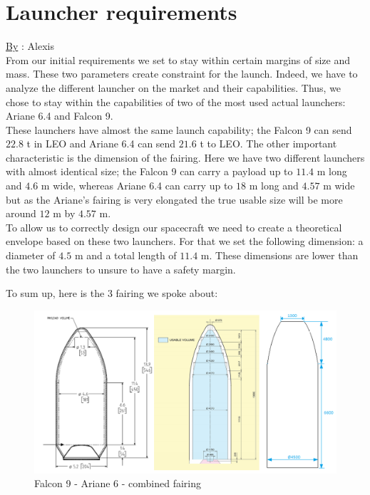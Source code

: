 \section{Launcher requirements}
\qquad \underline{By} : Alexis\\

From our initial requirements we set to stay within certain margins of size and mass. These two parameters create constraint for the launch. 
Indeed, we have to analyze the different launcher on the market and their capabilities. 
Thus, we chose to stay within the capabilities of two of the most used actual launchers: Ariane 6.4 and Falcon 9. \\

These launchers have almost the same launch capability; the Falcon 9 can send $22.8$ t in LEO and Ariane 6.4 can send $21.6$ t to LEO.
The other important characteristic is the dimension of the fairing.
Here we have two different launchers with almost identical size; the Falcon 9 can carry a payload up to $11.4$ m long and $4.6$ m wide, whereas Ariane 6.4 can carry up to $18$ m long and $4.57$ m wide but as the Ariane's fairing is very elongated the true usable size will be more around $12$ m by $4.57$ m. \\

To allow us to correctly design our spacecraft we need to create a theoretical envelope based on these two launchers. For that we set the following dimension: a diameter of $4.5$ m and a total length of $11.4$ m. These dimensions are lower than the two launchers to unsure to have a safety margin.

\clearpage

To sum up, here is the 3 fairing we spoke about:

\begin{figure}[H]
    \centering
    \includegraphics[width=\linewidth]{enveloppe}
    \caption{Falcon 9 - Ariane 6 - combined fairing}
    \label{fig:my_label}
\end{figure}

